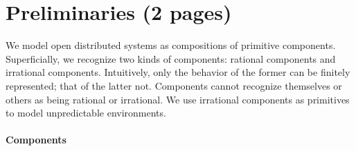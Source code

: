 \section{Preliminaries (2 pages)}


We model open distributed systems as compositions of primitive components.
Superficially, we recognize two kinds of components: rational components and irrational components.
Intuitively, only the behavior of the former can be finitely represented; that of the latter not.
Components cannot recognize themselves or others as being rational or irrational.
We use irrational components as primitives to model unpredictable environments.

\paragraph{Components}

